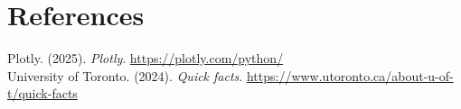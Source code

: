 \documentclass[fontsize=11pt]{article}
\begin{document}
\section*{References}

Plotly. (2025). \textit{Plotly}.
\url{https://plotly.com/python/}
\\
University of Toronto. (2024). \textit{Quick facts}.
\url{https://www.utoronto.ca/about-u-of-t/quick-facts}


\end{document}
